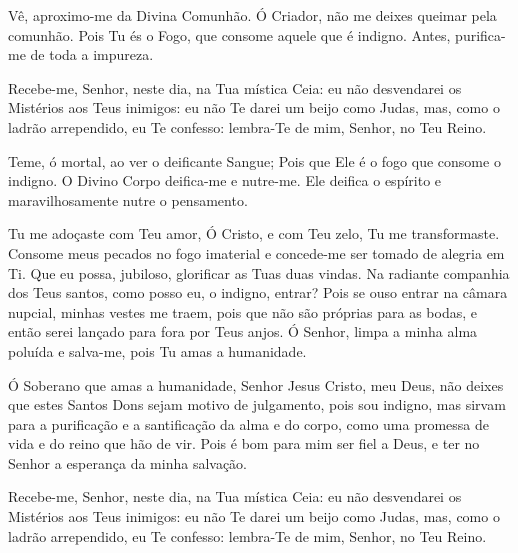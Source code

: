 \documentclass{subfiles}
\begin{document}

Vê, aproximo-me da Divina Comunhão.
Ó Criador, não me deixes queimar pela comunhão.
Pois Tu és o Fogo, que consome aquele que é indigno.
Antes, purifica-me de toda a impureza.


Recebe-me, Senhor, neste dia, na Tua mística Ceia: eu não desvendarei os
Mistérios aos Teus inimigos: eu não Te darei um beijo como Judas, mas, como o
ladrão arrependido, eu Te confesso: lembra-Te de mim, Senhor, no Teu Reino.


Teme, ó mortal, ao ver o deificante Sangue;
Pois que Ele é o fogo que consome o indigno.
O Divino Corpo deifica-me e nutre-me.
Ele deifica o espírito e maravilhosamente nutre o pensamento.


Tu me adoçaste com Teu amor, Ó Cristo, e com Teu zelo, Tu me transformaste.
Consome meus pecados no fogo imaterial e concede-me ser tomado de alegria em Ti.
Que eu possa, jubiloso, glorificar as Tuas duas vindas. Na radiante companhia
dos Teus santos, como posso eu, o indigno, entrar? Pois se ouso entrar na câmara
nupcial, minhas vestes me traem, pois que não são próprias para as bodas, e
então serei lançado para fora por Teus anjos. Ó Senhor, limpa a minha alma
poluída e salva-me, pois Tu amas a humanidade.


Ó Soberano que amas a humanidade, Senhor Jesus Cristo, meu Deus, não deixes que
estes Santos Dons sejam motivo de julgamento, pois sou indigno, mas sirvam para
a purificação e a santificação da alma e do corpo, como uma promessa de vida e
do reino que hão de vir. Pois é bom para mim ser fiel a Deus, e ter no Senhor a
esperança da minha salvação.


Recebe-me, Senhor, neste dia, na Tua mística Ceia: eu não desvendarei os
Mistérios aos Teus inimigos: eu não Te darei um beijo como Judas, mas, como o
ladrão arrependido, eu Te confesso: lembra-Te de mim, Senhor, no Teu Reino.
\end{document}
